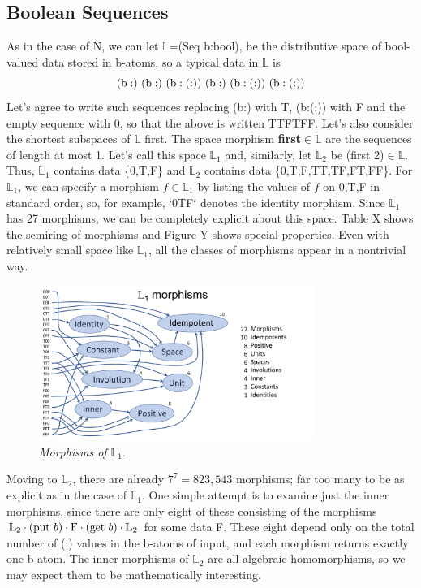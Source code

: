 \documentclass[11pt]{article}
\begin{document}
\subsection{Boolean Sequences}

As in the case of N, we can let $\mathbb L$=(Seq b:bool), be the distributive space of bool-valued data stored in b-atoms, so a typical data in $\mathbb L$ is 
\begin{equation}
{\rm (b:)\ (b:)\ (b:(:))\ (b:)\ (b:(:))\ (b:(:))}
\end{equation}
Let's agree to write such sequences replacing (b:) with T, (b:(:)) with F and the empty sequence with 0, so that the above is written TTFTFF.   
Let's also consider the shortest subspaces of $\mathbb L$ first.  The space morphism {\bf first}$\in\mathbb L$ are the sequences of length at most 1.  
Let's call this space ${\mathbb L}_1$ and, similarly, let ${\mathbb L}_2$ be (first 2)$\in\mathbb L$.  
Thus, ${\mathbb L}_1$ contains data \{0,T,F\} and ${\mathbb L}_2$ contains data \{0,T,F,TT,TF,FT,FF\}. 
For ${\mathbb L}_1$, we can specify a morphism $f\in {\mathbb L}_1$ by listing the values of $f$ on 0,T,F in standard order, so, for example, `0TF` denotes the identity morphism. 
Since ${\mathbb L}_1$ has 27 morphisms, we can be completely explicit about this space.  Table X shows the semiring of morphisms and Figure Y shows special 
properties.  Even with relatively small space like ${\mathbb L}_1$, all the classes of morphisms appear in a nontrivial way.

\begin{figure}[h]
\centering
\includegraphics[width=0.8\textwidth]{L1.pdf}
\caption{{\it Morphisms of ${\mathbb L}_1$.}}
\end{figure}

    Moving to ${\mathbb L}_2$, there are already $7^7=823,543$ morphisms; far too many to be as explicit as in the case of ${\mathbb L}_1$.  One simple attempt is to examine just the inner morphisms, since there are only eight of these consisting of 
 the morphisms ${\mathbb L}_2\cdot ({\rm put}\ b)\cdot {\rm F} \cdot ({\rm get}\ b) \cdot {\mathbb L}_2$
for some data F.  These eight depend only on the total number of (:) values in the b-atoms of input, and each morphism returns exactly one b-atom.  
The inner morphisms of ${\mathbb L}_2$ are all algebraic homomorphisms, so we may expect them to be
mathematically interesting.   
\end{document}
